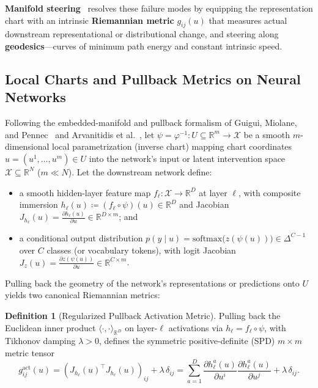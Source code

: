 \documentclass[11pt,a4paper]{article}
\newcommand{\R}{\mathbb{R}}
\theoremstyle{definition}
\newtheorem{definition}{Definition}[section]
\begin{document}
\textbf{Manifold steering}~\cite{wurgaft2026manifold,oozeer2026riemannian,kazama2026geosteer} resolves these failure modes by equipping the representation chart with an intrinsic \textbf{Riemannian metric} $g_{ij}(u)$ that measures actual downstream representational or distributional change, and steering along \textbf{geodesics}---curves of minimum path energy and constant intrinsic speed.

\subsection{Local Charts and Pullback Metrics on Neural Networks}

Following the embedded-manifold and pullback formalism of Guigui, Miolane, and Pennec~\cite{guigui2023geomstats} and Arvanitidis et al.~\cite{arvanitidis2018oddity}, let $\psi = \varphi^{-1} : U \subseteq \R^m \to \mathcal{X}$ be a smooth $m$-dimensional local parametrization (inverse chart) mapping chart coordinates $u = (u^1, \dots, u^m) \in U$ into the network's input or latent intervention space $\mathcal{X} \subseteq \R^N$ ($m \ll N$). Let the downstream network define:
\begin{itemize}[leftmargin=*]
    \item a smooth hidden-layer feature map $f_\ell : \mathcal{X} \to \R^D$ at layer $\ell$, with composite immersion $h_\ell(u) \coloneqq (f_\ell \circ \psi)(u) \in \R^D$ and Jacobian $J_{h_\ell}(u) = \frac{\partial h_\ell(u)}{\partial u} \in \R^{D \times m}$; and
    \item a conditional output distribution $p(y \mid u) = \mathrm{softmax}\!\bigl(z(\psi(u))\bigr) \in \Delta^{C-1}$ over $C$ classes (or vocabulary tokens), with logit Jacobian $J_z(u) = \frac{\partial z(\psi(u))}{\partial u} \in \R^{C \times m}$.
\end{itemize}

Pulling back the geometry of the network's representations or predictions onto $U$ yields two canonical Riemannian metrics:

\begin{definition}[Regularized Pullback Activation Metric]
Pulling back the Euclidean inner product $\langle \cdot, \cdot \rangle_{\R^D}$ on layer-$\ell$ activations via $h_\ell = f_\ell \circ \psi$, with Tikhonov damping $\lambda > 0$, defines the symmetric positive-definite (SPD) $m \times m$ metric tensor
\begin{equation}
    g^{\mathrm{act}}_{ij}(u) = \left(J_{h_\ell}(u)^\top J_{h_\ell}(u)\right)_{ij} + \lambda \, \delta_{ij}
    = \sum_{a=1}^{D} \frac{\partial h_\ell^a(u)}{\partial u^i} \frac{\partial h_\ell^a(u)}{\partial u^j} + \lambda \, \delta_{ij}.
    \label{eq:pullback-activation-metric}
\end{equation}
\end{definition}
\end{document}
